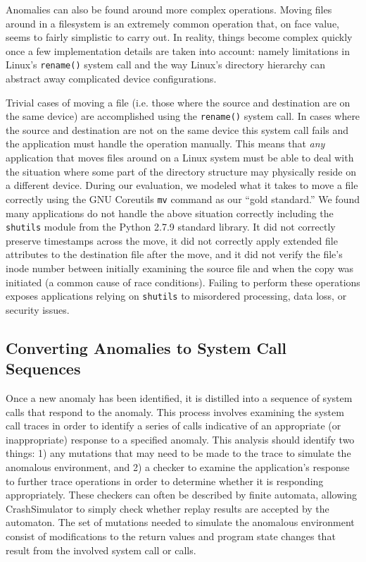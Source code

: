     Anomalies can also be found around more complex operations.  Moving files
    around in a filesystem is an extremely common operation that, on face value,
    seems to fairly simplistic to carry out.  In reality, things become complex
    quickly once a few implementation details are taken into account: namely
    limitations in Linux's {\tt rename()} system call and the way Linux's
    directory hierarchy can abstract away complicated device configurations.

    Trivial cases of moving a file (i.e. those where the source and destination
    are on the same device) are accomplished using the {\tt rename()} system
    call.  In cases where the source and destination are not on the same device
    this system call fails and the application must handle the operation
    manually. This means that \emph{any} application that moves files around on
    a Linux system must be able to deal with the situation where some part of
    the directory structure may physically reside on a different device.
    During our evaluation, we modeled what
    it takes to move a file correctly using the GNU Coreutils {\tt mv} command
    as our ``gold standard.''  We found many applications do not handle the
    above situation correctly including the {\tt shutils} module from the Python
    2.7.9 standard library.  It did not correctly preserve timestamps across the
    move, it did not correctly apply extended file attributes to the destination
    file after the move, and it did not verify the file's inode number between
    initially examining the source file and when the copy was initiated (a
    common cause of race conditions).  Failing to perform these operations
    exposes applications relying on {\tt shutils} to misordered processing, data
    loss, or security issues.

    \subsection{Converting Anomalies to System Call Sequences}

    Once a new anomaly has been identified, it is distilled into a sequence of
    system calls that respond to the anomaly.  This process
    involves examining the system call traces
    in order to
    identify a series of calls indicative of an appropriate (or inappropriate)
    response to a specified anomaly.
    This analysis should identify two things: 1) any mutations that may need to be
    made to the trace to simulate the anomalous environment, and 2) a checker to
    examine the application's response to further trace operations in order to
    determine
    whether it is responding appropriately. These checkers can often be 
    described by finite automata, allowing CrashSimulator to simply check
    whether replay results are accepted by the automaton.  The set of mutations
    needed to simulate the anomalous environment consist of modifications
    to the return values and program state changes that result from the involved
    system call or calls.

